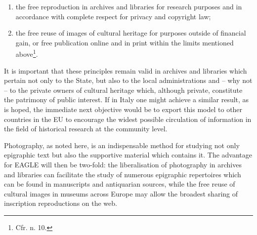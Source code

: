 \documentclass[amsthm,ebook]{saparticle}
\begin{document}
\begin{enumerate}
\item the free reproduction in archives and libraries for research purposes and in accordance with complete respect for
privacy and copyright law;

\item the free reuse of images of cultural heritage for purposes outside of financial gain, or free publication online
and in print within the limits mentioned above\footnote{Cfr. n. 10.}.

\end{enumerate}

It is important that these principles remain valid in archives and libraries which pertain not only to the State, but
also to the local administrations and – why not – to the private owners of cultural heritage which, although private,
constitute the patrimony of public interest. If in Italy one might achieve a similar result, as is hoped, the immediate
next objective would be to export this model to other countries in the EU to encourage the widest possible circulation
of information in the field of historical research at the community level.

Photography, as noted here, is an indispensable method for studying not only epigraphic text but also the supportive
material which contains it. The advantage for EAGLE will then be two-fold: the liberalisation of photography in
archives and libraries can facilitate the study of numerous epigraphic repertoires which can be found in manuscripts
and antiquarian sources, while the free reuse of cultural images in museums across Europe may allow the broadest
sharing of inscription reproductions on the web.

\nocite{brugnoli_riproduzione_2013}
\nocite{casini_gli_2015}
\nocite{ciociola_libere_2015}
\nocite{gallo_il_2014}
\nocite{giunta_viva_2015}
\nocite{lupoli_libere_2015}
\nocite{manacorda_fotografare_2014}
\nocite{manacorda_tutela._2014}
\nocite{modolo_ricerca_2015}
\nocite{pavolini_situazione_2015}
\nocite{pigliaru_selfie_2015}
\nocite{stella_gabella_2014}
\nocite{stella_costose_2015}
\nocite{stella_biblioteche_2015}
\nocite{tumicelli_questione_2014}
\nocite{volpe_limmagine_2014}
\nocite{_lettera_2015}
\nocite{_appello_2013}



\end{document}
